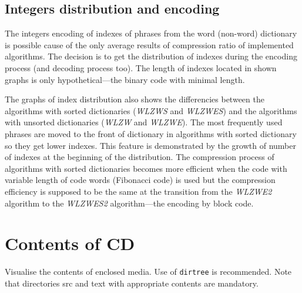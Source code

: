 \documentclass[thesis=M,english]{FITthesis}[2012/10/20]
\begin{document}
\section{Integers distribution and encoding}\label{sec:distr}

The integers encoding of indexes of phrases from the word (non-word) dictionary is possible cause of the only average results of compression ratio of implemented algorithms. The decision is to get the distribution of indexes during the encoding process (and decoding process too). The length of indexes located in shown graphs is only hypothetical---the binary code with minimal length.

The graphs of index distribution also shows the differencies between the algorithms with sorted dictionaries (\textit{WLZWS} and \textit{WLZWES}) and the algorithms with unsorted dictionaries (\textit{WLZW} and \textit{WLZWE}). The most frequently used phrases are moved to the front of dictionary in algorithms with sorted dictionary so they get lower indexes. This feature is demonstrated by the growth of number of indexes at the beginning of the distribution. The compression process of algorithms with sorted dictionaries becomes more efficient when the code with variable length of code words (Fibonacci code) is used but the compression efficiency is supposed to be the same at the transition from the \textit{WLZWE2} algorithm to the \textit{WLZWES2} algorithm---the encoding by block code.

\begin{conclusion}

\end{conclusion}




\appendix


\chapter{Contents of CD}\label{app:CDcontent}

Visualise the contents of enclosed media. Use of \verb|dirtree| is recommended. Note that directories src and text with appropriate contents are mandatory.


\begin{figure}
\end{figure}
\end{document}

